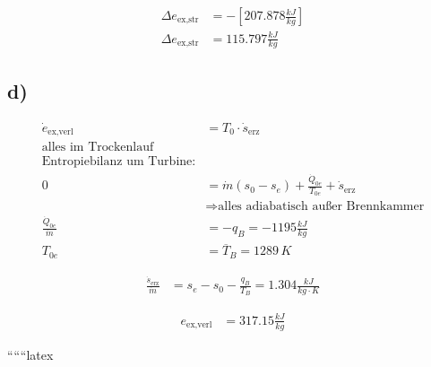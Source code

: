 \begin{align*}
\Delta e_{\text{ex,str}} &= -\left[ 207.878 \frac{kJ}{kg} \right] \\
\Delta e_{\text{ex,str}} &= 115.797 \frac{kJ}{kg}
\end{align*}

\subsection*{d)}

\begin{align*}
\dot{e}_{\text{ex,verl}} &= T_0 \cdot \dot{s}_{\text{erz}} \\
\text{alles im Trockenlauf} \\
\text{Entropiebilanz um Turbine:} \\
0 &= \dot{m} \left( s_0 - s_e \right) + \frac{\dot{Q}_{0e}}{T_{0e}} + \dot{s}_{\text{erz}} \\
&\Rightarrow \text{alles adiabatisch außer Brennkammer} \\
\frac{\dot{Q}_{0e}}{\dot{m}} &= -q_B = -1195 \frac{kJ}{kg} \\
T_{0e} &= \overline{T}_B = 1289 \, K
\end{align*}

\begin{align*}
\frac{\dot{s}_{\text{erz}}}{\dot{m}} &= s_e - s_0 - \frac{q_B}{T_B} = 1.304 \frac{kJ}{kg \cdot K}
\end{align*}

\begin{align*}
e_{\text{ex,verl}} &= 317.15 \frac{kJ}{kg}
\end{align*}

``````latex


